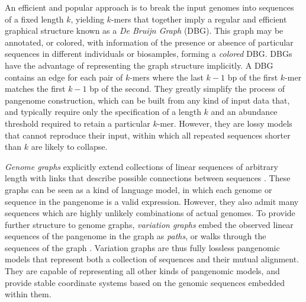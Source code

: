 An efficient and popular approach is to break the input genomes into sequences of a fixed length $k$, yielding $k$-mers that together imply a regular and efficient graphical structure known as a \emph{De Bruijn Graph} (DBG).
This graph may be annotated, or colored, with information of the presence or absence of particular sequences in different individuals or biosamples, forming a \emph{colored} DBG.
DBGs have the advantage of representing the graph structure implicitly.
A DBG contains an edge for each pair of $k$-mers where the last $k-1$ bp of the first $k$-mer matches the first $k-1$ bp of the second.
They greatly simplify the process of pangenome construction, which can be built from any kind of input data that, and typically require only the specification of a length $k$ and an abundance threshold required to retain a particular $k$-mer.
However, they are lossy models that cannot reproduce their input, within which all repeated sequences shorter than $k$ are likely to collapse.

\emph{Genome graphs} explicitly extend collections of linear sequences of arbitrary length with links that describe possible connections between sequences \cite{Paten_2017}.
These graphs can be seen as a kind of language model, in which each genome or sequence in the pangenome is a valid expression.
However, they also admit many sequences which are highly unlikely combinations of actual genomes.
To provide further structure to genome graphs, \emph{variation graphs} embed the observed linear sequences of the pangenome in the graph as \emph{paths}, or walks through the sequences of the graph \cite{Garrison_2018}.
Variation graphs are thus fully lossless pangenomic models that represent both a collection of sequences and their mutual alignment.
They are capable of representing all other kinds of pangenomic models, and provide stable coordinate systems based on the genomic sequences embedded within them.





